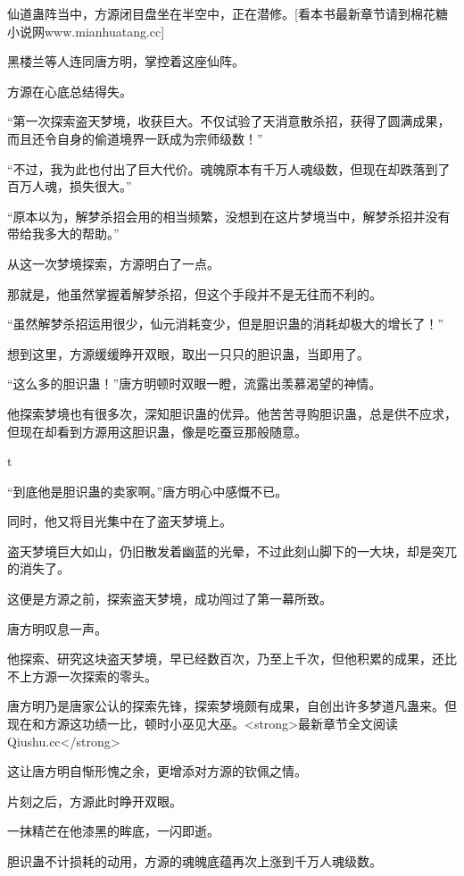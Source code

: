 
\begin{this_body}

仙道蛊阵当中，方源闭目盘坐在半空中，正在潜修。[看本书最新章节请到棉花糖小说网www.mianhuatang.cc]

黑楼兰等人连同唐方明，掌控着这座仙阵。

方源在心底总结得失。

“第一次探索盗天梦境，收获巨大。不仅试验了天消意散杀招，获得了圆满成果，而且还令自身的偷道境界一跃成为宗师级数！”

“不过，我为此也付出了巨大代价。魂魄原本有千万人魂级数，但现在却跌落到了百万人魂，损失很大。”

“原本以为，解梦杀招会用的相当频繁，没想到在这片梦境当中，解梦杀招并没有带给我多大的帮助。”

从这一次梦境探索，方源明白了一点。

那就是，他虽然掌握着解梦杀招，但这个手段并不是无往而不利的。

“虽然解梦杀招运用很少，仙元消耗变少，但是胆识蛊的消耗却极大的增长了！”

想到这里，方源缓缓睁开双眼，取出一只只的胆识蛊，当即用了。

“这么多的胆识蛊！”唐方明顿时双眼一瞪，流露出羡慕渴望的神情。

他探索梦境也有很多次，深知胆识蛊的优异。他苦苦寻购胆识蛊，总是供不应求，但现在却看到方源用这胆识蛊，像是吃蚕豆那般随意。

t

“到底他是胆识蛊的卖家啊。”唐方明心中感慨不已。

同时，他又将目光集中在了盗天梦境上。

盗天梦境巨大如山，仍旧散发着幽蓝的光晕，不过此刻山脚下的一大块，却是突兀的消失了。

这便是方源之前，探索盗天梦境，成功闯过了第一幕所致。

唐方明叹息一声。

他探索、研究这块盗天梦境，早已经数百次，乃至上千次，但他积累的成果，还比不上方源一次探索的零头。

唐方明乃是唐家公认的探索先锋，探索梦境颇有成果，自创出许多梦道凡蛊来。但现在和方源这功绩一比，顿时小巫见大巫。<strong>最新章节全文阅读Qiushu.cc</strong>

这让唐方明自惭形愧之余，更增添对方源的钦佩之情。

片刻之后，方源此时睁开双眼。

一抹精芒在他漆黑的眸底，一闪即逝。

胆识蛊不计损耗的动用，方源的魂魄底蕴再次上涨到千万人魂级数。


\end{this_body}
